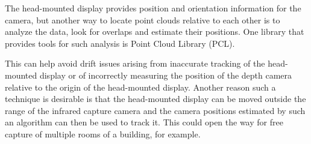 \documentclass[pageno]{jpaper}
\begin{document}
The head-mounted display provides position and orientation information for the
camera, but another way to locate point clouds relative to each other is to
analyze the data, look for overlaps and estimate their positions. One library
that provides tools for such analysis is Point Cloud Library (PCL).

This can help avoid drift issues arising from inaccurate tracking of the
head-mounted display or of incorrectly measuring the position of the depth
camera relative to the origin of the head-mounted display. Another reason such a
technique is desirable is that the head-mounted display can be moved outside the
range of the infrared capture camera and the camera positions estimated by such
an algorithm can then be used to track it. This could open the way for free
capture of multiple rooms of a building, for example.



\end{document}

